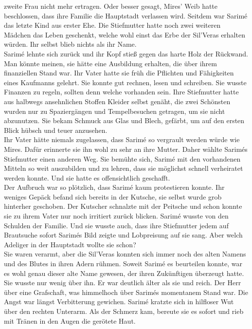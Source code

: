 zweite Frau nicht mehr ertragen. Oder besser gesagt, Mires' Weib hatte beschlossen, dass ihre 
Familie die Hauptstadt verlassen wird. Seitdem war Sarimé das letzte Kind aus erster Ehe. Die 
Stiefmutter hatte noch zwei weiteren Mädchen das Leben geschenkt, welche wohl einst das Erbe der 
Sil'Veras erhalten würden. Ihr selbst blieb nichts als ihr Name.\\
Sarimé lehnte sich zurück und ihr Kopf stieß gegen das harte Holz der Rückwand. Man könnte meinen, 
sie hätte eine Ausbildung erhalten, die über ihrem finanziellen Stand war. Ihr Vater hatte sie früh 
die Pflichten und Fähigkeiten eines Kaufmanns gelehrt. Sie konnte gut rechnen, lesen und schreiben. 
Sie wusste Finanzen zu regeln, sollten denn welche vorhanden sein. Ihre Stiefmutter hatte aus 
halbwegs ansehnlichen Stoffen Kleider selbst genäht, die zwei Schönsten wurden nur zu Spaziergängen 
und Tempelbesuchen getragen, um sie nicht abzunutzen. Sie bekam Schmuck aus Glas und Blech, gefärbt, 
um auf den ersten Blick hübsch und teuer anzusehen. \\
Ihr Vater hätte niemals zugelassen, dass Sarimé so vergrault werden würde wie Mires. 
Dafür erinnerte sie ihn wohl zu sehr an ihre Mutter. Daher wählte Sarimés Stiefmutter einen anderen 
Weg. Sie bemühte sich, Sarimé mit den vorhandenen Mitteln so weit auszubilden und zu lehren, dass 
sie möglichst schnell verheiratet werden konnte. Und sie hatte es offensichtlich geschafft. \\
Der Aufbruch war so plötzlich, dass Sarimé kaum protestieren konnte. Ihr weniges Gepäck befand sich 
bereits in der Kutsche, sie selbst wurde grob hinterher geschoben. Der Kutscher schnalzte mit der 
Peitsche und schon konnte sie zu ihrem Vater nur noch irritiert zurück blicken. Sarimé wusste von 
den Schulden der Familie. Und sie wusste auch, dass ihre Stiefmutter jedem auf Brautsuche sofort 
Sarimés Bild zeigte und Lobpreisung auf sie sang. Aber welch Adeliger in der Hauptstadt wollte sie 
schon? \\
Sie waren verarmt, aber die Sil'Veras konnten sich immer noch des alten Namens und des Blutes in 
ihren Adern rühmen. Soweit Sarimé es beurteilen konnte, war es wohl genau dieser alte Name gewesen, 
der ihren Zukünftigen überzeugt hatte. Sie wusste nur wenig über ihn. Er war deutlich älter als sie 
und reich. Der Herr über eine Grafschaft, was himmelhoch über Sarimés momentanem Stand war. Die 
Angst war längst Verbitterung gewichen. Sarimé kratzte sich in hilfloser Wut über den rechten 
Unterarm. Als der Schmerz kam, bereute sie es sofort und rieb mit Tränen in den Augen die gerötete 
Haut. \\

